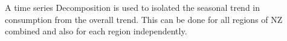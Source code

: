 \documentclass[
]{article}
\begin{document}

A time series Decomposition is used to isolated the seasonal trend in
consumption from the overall trend. This can be done for all regions of
NZ combined and also for each region independently.
\end{document}
